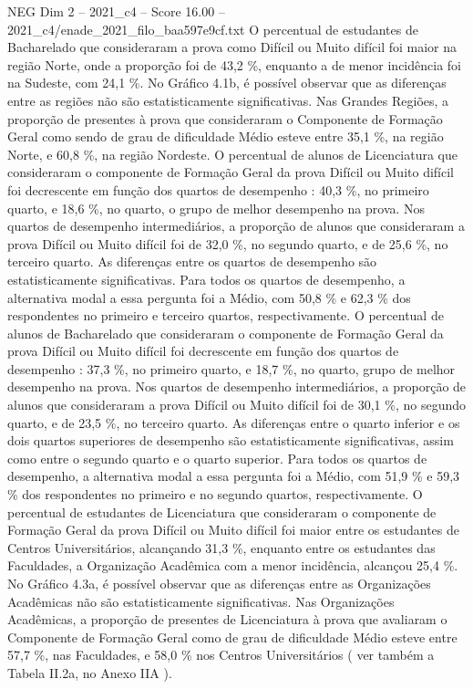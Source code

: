 \begin{textsample}{NEG Dim 2 – 2021\_c4 – Score 16.00 – 2021\_c4/enade\_2021\_filo\_baa597e9cf.txt}
O percentual de estudantes de Bacharelado que consideraram a prova como Difícil ou Muito difícil foi maior na região Norte, onde a proporção foi de 43,2 \%, enquanto a de menor incidência foi na Sudeste, com 24,1 \%.
No Gráfico 4.1b, é possível observar que as diferenças entre as regiões não são estatisticamente significativas.
Nas Grandes Regiões, a proporção de presentes à prova que consideraram o Componente de Formação Geral como sendo de grau de dificuldade Médio esteve entre 35,1 \%, na região Norte, e 60,8 \%, na região Nordeste.
O percentual de alunos de Licenciatura que consideraram o componente de Formação Geral da prova Difícil ou Muito difícil foi decrescente em função dos quartos de desempenho : 40,3 \%, no primeiro quarto, e 18,6 \%, no quarto, o grupo de melhor desempenho na prova.
Nos quartos de desempenho intermediários, a proporção de alunos que consideraram a prova Difícil ou Muito difícil foi de 32,0 \%, no segundo quarto, e de 25,6 \%, no terceiro quarto.
As diferenças entre os quartos de desempenho são estatisticamente significativas.
Para todos os quartos de desempenho, a alternativa modal a essa pergunta foi a Médio, com 50,8 \% e 62,3 \% dos respondentes no primeiro e terceiro quartos, respectivamente.
O percentual de alunos de Bacharelado que consideraram o componente de Formação Geral da prova Difícil ou Muito difícil foi decrescente em função dos quartos de desempenho : 37,3 \%, no primeiro quarto, e 18,7 \%, no quarto, grupo de melhor desempenho na prova.
Nos quartos de desempenho intermediários, a proporção de alunos que consideraram a prova Difícil ou Muito difícil foi de 30,1 \%, no segundo quarto, e de 23,5 \%, no terceiro quarto.
As diferenças entre o quarto inferior e os dois quartos superiores de desempenho são estatisticamente significativas, assim como entre o segundo quarto e o quarto superior.
Para todos os quartos de desempenho, a alternativa modal a essa pergunta foi a Médio, com 51,9 \% e 59,3 \% dos respondentes no primeiro e no segundo quartos, respectivamente.
O percentual de estudantes de Licenciatura que consideraram o componente de Formação Geral da prova Difícil ou Muito difícil foi maior entre os estudantes de Centros Universitários, alcançando 31,3 \%, enquanto entre os estudantes das Faculdades, a Organização Acadêmica com a menor incidência, alcançou 25,4 \%.
No Gráfico 4.3a, é possível observar que as diferenças entre as Organizações Acadêmicas não são estatisticamente significativas.
Nas Organizações Acadêmicas, a proporção de presentes de Licenciatura à prova que avaliaram o Componente de Formação Geral como de grau de dificuldade Médio esteve entre 57,7 \%, nas Faculdades, e 58,0 \% nos Centros Universitários ( ver também a Tabela II.2a, no Anexo IIA ).

\end{textsample}
